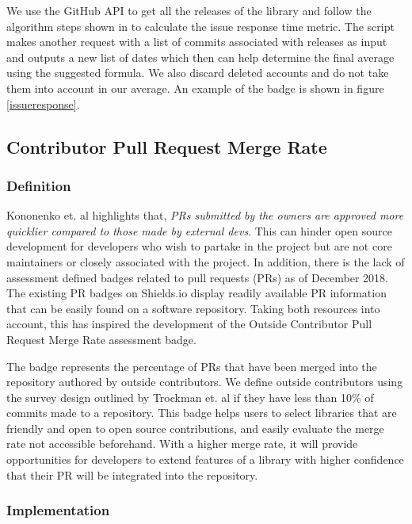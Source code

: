 \documentclass[12pt, letterpaper]{article}
\begin{document}
We use the GitHub \cite{github} API to get all the releases of the library and follow the algorithm
steps shown in \cite{metrics} to calculate the issue response time metric.
The script makes another request with a list of commits associated with releases as input
and outputs a new list of dates which then can help determine the final average using the suggested
formula.
We also discard deleted accounts and do not take them into account in our average.
An example of the badge is shown in figure \ref{issueresponse}.


\subsection{Contributor Pull Request Merge Rate}
\subsubsection{Definition}
Kononenko et. al \cite{shopifyarticle} highlights that, \textit{PRs submitted by the owners are approved more
quicklier compared to those made by external devs}. This can hinder open source development
for developers who wish to partake in the project but are not core maintainers or closely associated with the project.
In addition, there is the lack of assessment defined badges \cite{githubbadges} related to pull requests (PRs)
as of December 2018.
The existing PR badges on Shields.io \cite{shields} display readily available PR information that can be easily found on a 
software repository. Taking both resources \cite{shields, shopifyarticle} into account, this has inspired
the development of the Outside Contributor Pull Request Merge Rate assessment badge. 


The badge represents the percentage of PRs that have been merged into the repository authored by outside contributors.
We define outside contributors using the survey design outlined by Trockman et. al \cite{githubbadges} if they have 
less than 10\% of commits made to a repository.
This badge helps users to select libraries that are friendly and open to open source contributions,
and easily evaluate the merge rate not accessible beforehand.
With a higher merge rate, it will provide opportunities for developers to extend features of a library with 
higher confidence that their PR will be integrated into the repository.

\subsubsection{Implementation}
\end{document}
